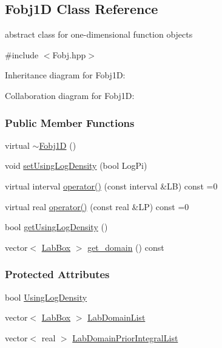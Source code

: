 \hypertarget{classFobj1D}{\subsection{\-Fobj1\-D \-Class \-Reference}
\label{classFobj1D}
}


abstract class for one-\/dimensional function objects  




{\ttfamily \#include $<$\-Fobj.\-hpp$>$}



\-Inheritance diagram for \-Fobj1\-D\-:


\-Collaboration diagram for \-Fobj1\-D\-:
\subsubsection*{\-Public \-Member \-Functions}
\begin{DoxyCompactItemize}
\item 
virtual \hyperlink{classFobj1D_aa878f95df9f5798d2050e113ea97dea7}{$\sim$\-Fobj1\-D} ()
\item 
void \hyperlink{classFobj1D_ab11d43cdd2d745e945890d95d86f015d}{set\-Using\-Log\-Density} (bool \-Log\-Pi)
\item 
virtual interval \hyperlink{classFobj1D_ae7708006f849c35e8e1234faa1ec4140}{operator()} (const interval \&\-L\-B) const =0
\item 
virtual real \hyperlink{classFobj1D_a46c44b0732f59bd8327ee929592ec5e8}{operator()} (const real \&\-L\-P) const =0
\item 
bool \hyperlink{classFobj1D_a7a4b486c3e3c08c1d3b2cf7dc66497f6}{get\-Using\-Log\-Density} ()
\item 
vector$<$ \hyperlink{classLabBox}{\-Lab\-Box} $>$ \hyperlink{classFobj1D_ab13c2a6d58d85b97bfb8c8b7e3c7cbdd}{get\-\_\-domain} () const 
\end{DoxyCompactItemize}
\subsubsection*{\-Protected \-Attributes}
\begin{DoxyCompactItemize}
\item 
bool \hyperlink{classFobj1D_a538b74d7dc5b9e3652c2a36950f25de9}{\-Using\-Log\-Density}
\item 
vector$<$ \hyperlink{classLabBox}{\-Lab\-Box} $>$ \hyperlink{classFobj1D_ad2c10838556997430a304824b745e090}{\-Lab\-Domain\-List}
\item 
vector$<$ real $>$ \hyperlink{classFobj1D_a37fff89dd0ffdea65e7dad2b148eb629}{\-Lab\-Domain\-Prior\-Integral\-List}
\end{DoxyCompactItemize}


